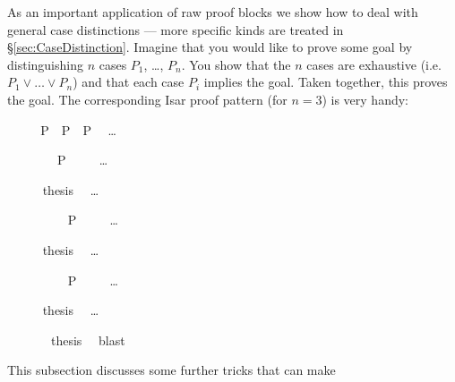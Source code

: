 \begin{isabellebody}
\begin{isamarkuptext}
As an important application of raw proof blocks we show how to deal
with general case distinctions --- more specific kinds are treated in
\S\ref{sec:CaseDistinction}. Imagine that you would like to prove some
goal by distinguishing $n$ cases $P_1$, \dots, $P_n$. You show that
the $n$ cases are exhaustive (i.e.\ $P_1 \lor \dots \lor P_n$) and
that each case $P_i$ implies the goal. Taken together, this proves the
goal. The corresponding Isar proof pattern (for $n = 3$) is very handy:%
\end{isamarkuptext}%
%
\renewcommand{\isamarkupcmt}[1]{#1}
%
\isadelimproof
%
\endisadelimproof
%
\isatagproof
\isamarkupfalse%
\ {\isacharminus}\isanewline
\ \ \isamarkupfalse%
\ {\isachardoublequote}P\ {\isasymor}\ P\ {\isasymor}\ P\ \ %
\isamarkupcmt{\dots%
}
\isanewline
\ \ \isamarkupfalse%
\isanewline
\ \ \isamarkupfalse%
\isacommand{{\isacharbraceleft}}\ \isamarkupfalse%
\ P\isanewline
\ \ \ \ %
\isamarkupcmt{\dots%
}
\isanewline
\ \ \ \ \isamarkupfalse%
\ {\isacharquery}thesis\ \ %
\isamarkupcmt{\dots%
}
\ \isamarkupfalse%
\isacommand{{\isacharbraceright}}\isanewline
\ \ \isamarkupfalse%
\isanewline
\ \ \isamarkupfalse%
\isacommand{{\isacharbraceleft}}\ \isamarkupfalse%
\ P\isanewline
\ \ \ \ %
\isamarkupcmt{\dots%
}
\isanewline
\ \ \ \ \isamarkupfalse%
\ {\isacharquery}thesis\ \ %
\isamarkupcmt{\dots%
}
\ \isamarkupfalse%
\isacommand{{\isacharbraceright}}\isanewline
\ \ \isamarkupfalse%
\isanewline
\ \ \isamarkupfalse%
\isacommand{{\isacharbraceleft}}\ \isamarkupfalse%
\ P\isanewline
\ \ \ \ %
\isamarkupcmt{\dots%
}
\isanewline
\ \ \ \ \isamarkupfalse%
\ {\isacharquery}thesis\ \ %
\isamarkupcmt{\dots%
}
\ \isamarkupfalse%
\isacommand{{\isacharbraceright}}\isanewline
\ \ \isamarkupfalse%
\ \isamarkupfalse%
\ {\isacharquery}thesis\ \isamarkupfalse%
\ blast\isanewline
\isamarkupfalse%
%
\endisatagproof
{\isafoldproof}%
%
\isadelimproof
%
\endisadelimproof
%
\renewcommand{\isamarkupcmt}[1]{{\isastylecmt--- #1}}
\isamarkuptrue%
%
\isamarkuptrue%
%
\begin{isamarkuptext}%
This subsection discusses some further tricks that can make

\end{isamarkuptext}
\end{isabellebody}
